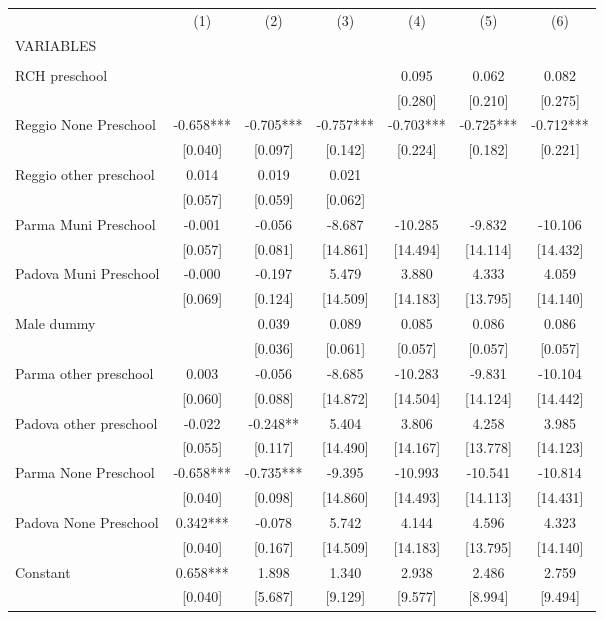 \begin{tabular}{lcccccc} \hline
 & (1) & (2) & (3) & (4) & (5) & (6) \\
VARIABLES &  &  &  &  &  &  \\ \hline
 &  &  &  &  &  &  \\
RCH preschool &  &  &  & 0.095 & 0.062 & 0.082 \\
 &  &  &  & [0.280] & [0.210] & [0.275] \\
Reggio None Preschool & -0.658*** & -0.705*** & -0.757*** & -0.703*** & -0.725*** & -0.712*** \\
 & [0.040] & [0.097] & [0.142] & [0.224] & [0.182] & [0.221] \\
Reggio other preschool & 0.014 & 0.019 & 0.021 &  &  &  \\
 & [0.057] & [0.059] & [0.062] &  &  &  \\
Parma Muni Preschool & -0.001 & -0.056 & -8.687 & -10.285 & -9.832 & -10.106 \\
 & [0.057] & [0.081] & [14.861] & [14.494] & [14.114] & [14.432] \\
Padova Muni Preschool & -0.000 & -0.197 & 5.479 & 3.880 & 4.333 & 4.059 \\
 & [0.069] & [0.124] & [14.509] & [14.183] & [13.795] & [14.140] \\
Male dummy &  & 0.039 & 0.089 & 0.085 & 0.086 & 0.086 \\
 &  & [0.036] & [0.061] & [0.057] & [0.057] & [0.057] \\
Parma other preschool & 0.003 & -0.056 & -8.685 & -10.283 & -9.831 & -10.104 \\
 & [0.060] & [0.088] & [14.872] & [14.504] & [14.124] & [14.442] \\
Padova other preschool & -0.022 & -0.248** & 5.404 & 3.806 & 4.258 & 3.985 \\
 & [0.055] & [0.117] & [14.490] & [14.167] & [13.778] & [14.123] \\
Parma None Preschool & -0.658*** & -0.735*** & -9.395 & -10.993 & -10.541 & -10.814 \\
 & [0.040] & [0.098] & [14.860] & [14.493] & [14.113] & [14.431] \\
Padova None Preschool & 0.342*** & -0.078 & 5.742 & 4.144 & 4.596 & 4.323 \\
 & [0.040] & [0.167] & [14.509] & [14.183] & [13.795] & [14.140] \\
Constant & 0.658*** & 1.898 & 1.340 & 2.938 & 2.486 & 2.759 \\
 & [0.040] & [5.687] & [9.129] & [9.577] & [8.994] & [9.494] \\

\end{tabular}

